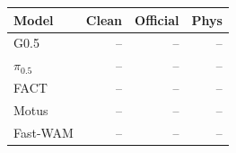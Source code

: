 \begin{tabular}{lrrr}
\hline
Model & Clean & Official & Phys \\
\hline
G0.5 & -- & -- & -- \\
$\pi_{0.5}$ & -- & -- & -- \\
FACT & -- & -- & -- \\
Motus & -- & -- & -- \\
Fast-WAM & -- & -- & -- \\
\hline
\end{tabular}
